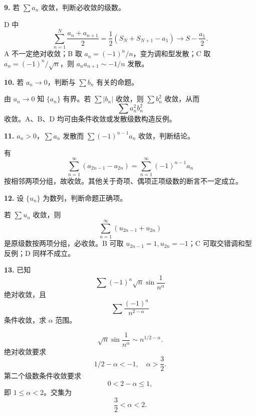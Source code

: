 \begin{problemblock}
\textbf{9.} 若 \(\sum a_n\) 收敛，判断必收敛的级数。
\end{problemblock}
\begin{solutionblock}
D 中
\[
\sum_{n=1}^N\frac{a_n+a_{n+1}}2
=\frac12(S_N+S_{N+1}-a_1)\to S-\frac{a_1}{2}.
\]
A 不一定绝对收敛；B 取 \(a_n=(-1)^n/n\)，变为调和型发散；C 取 \(a_n=(-1)^n/\sqrt n\)，则 \(a_na_{n+1}\sim-1/n\) 发散。
\end{solutionblock}

\begin{problemblock}
\textbf{10.} 若 \(a_n\to0\)，判断与 \(\sum b_n\) 有关的命题。
\end{problemblock}
\begin{solutionblock}
由 \(a_n\to0\) 知 \(\{a_n\}\) 有界。若 \(\sum|b_n|\) 收敛，则 \(\sum b_n^2\) 收敛，从而
\[
\sum a_n^2b_n^2
\]
收敛。A、B、D 均可由条件收敛或发散级数构造反例。
\end{solutionblock}

\begin{problemblock}
\textbf{11.} \(a_n>0\)，\(\sum a_n\) 发散而 \(\sum(-1)^{n-1}a_n\) 收敛，判断结论。
\end{problemblock}
\begin{solutionblock}
有
\[
\sum_{n=1}^{\infty}(a_{2n-1}-a_{2n})
=\sum_{n=1}^{\infty}(-1)^{n-1}a_n
\]
按相邻两项分组，故收敛。其他关于奇项、偶项正项级数的断言不一定成立。
\end{solutionblock}

\begin{problemblock}
\textbf{12.} 设 \(\{u_n\}\) 为数列，判断命题正确项。
\end{problemblock}
\begin{solutionblock}
若 \(\sum u_n\) 收敛，则
\[
\sum_{n=1}^{\infty}(u_{2n-1}+u_{2n})
\]
是原级数按两项分组，必收敛。B 可取 \(u_{2n-1}=1,u_{2n}=-1\)；C 可取交错调和型反例；D 同样不成立。
\end{solutionblock}

\begin{problemblock}
\textbf{13.} 已知
\[
\sum (-1)^n\sqrt n\sin\frac1{n^\alpha}
\]
绝对收敛，且
\[
\sum\frac{(-1)^n}{n^{2-\alpha}}
\]
条件收敛，求 \(\alpha\) 范围。
\end{problemblock}
\begin{solutionblock}
\[
\sqrt n\sin\frac1{n^\alpha}\sim n^{1/2-\alpha}.
\]
绝对收敛要求
\[
1/2-\alpha<-1,\quad \alpha>\frac32.
\]
第二个级数条件收敛要求
\[
0<2-\alpha\le1,
\]
即 \(1\le\alpha<2\)。交集为
\[
\boxed{\frac32<\alpha<2}.
\]
\end{solutionblock}

